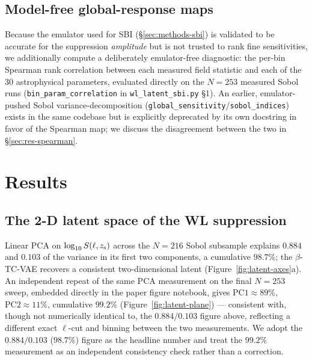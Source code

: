 \documentclass[11pt]{article}
\newcommand{\sez}{S(\ell, z_{\rm s})}
\begin{document}
\subsection{Model-free global-response maps}\label{sec:methods-spearman}

Because the emulator used for SBI (\S\ref{sec:methods-sbi}) is validated
to be accurate for the suppression \emph{amplitude} but is not trusted to
rank fine sensitivities, we additionally compute a deliberately
emulator-free diagnostic: the per-bin Spearman rank correlation between
each measured field statistic and each of the 30 astrophysical parameters,
evaluated directly on the $N=253$ measured Sobol runs
(\texttt{bin\_param\_correlation} in \texttt{wl\_latent\_sbi.py} \S1). %
An earlier, emulator-pushed Sobol variance-decomposition
(\texttt{global\_sensitivity}/\texttt{sobol\_indices}) exists in the same
codebase but is explicitly deprecated by its own docstring in favor of the
Spearman map; we discuss the disagreement between the two in
\S\ref{sec:res-spearman}.

\section{Results}\label{sec:results}

\subsection{The 2-D latent space of the WL suppression}\label{sec:res-latent}

Linear PCA on $\log_{10}\sez$ across the $N=216$ Sobol subsample explains
$0.884$ and $0.103$ of the variance in its first two components, a
cumulative $98.7\%$; the $\beta$-TC-VAE recovers a consistent
two-dimensional latent (Figure~\ref{fig:latent-axes}a). %
An independent repeat of the same PCA measurement on the final $N=253$
sweep, embedded directly in the paper figure notebook, gives
$\mathrm{PC1}\!\approx\!89\%$, $\mathrm{PC2}\!\approx\!11\%$, cumulative
$99.2\%$ (Figure~\ref{fig:latent-plane}) — consistent with, though not
numerically identical to, the $0.884/0.103$ figure above, reflecting a
different exact $\ell$-cut and binning between the two measurements. %
We adopt the $0.884/0.103$ ($98.7\%$) figure as the headline number and
treat the $99.2\%$ measurement as an independent consistency check rather
than a correction.
\end{document}
